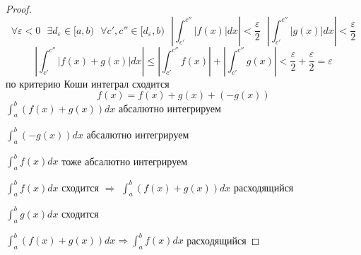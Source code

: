 \begin{proof}
  $$
  \forall \varepsilon < 0 ~~~ \exists d_{\varepsilon} \in [a,b) ~~~
  \forall c', c'' \in [d_{\varepsilon}, b) ~~~
  \left| \int_{c'}^{c''} |f(x)|dx \right| < \frac{\varepsilon}{2} ~~~
  \left| \int_{c'}^{c''} |g(x)|dx \right| < \frac{\varepsilon}{2}
  $$
  $$
  \left| \int_{c'}^{c''} |f(x) + g(x)| dx \right| \le
  \left| \int_{c'}^{c''} f(x) \right| + \left| \int_{c'}^{c''} g(x) \right|
  < \frac{\varepsilon}{2} + \frac{\varepsilon}{2} = \varepsilon
  $$
  по критерию Коши интеграл сходится
  $$
  f(x) = f(x) + g(x) + (-g(x))
  $$
  $\int_a^b (f(x) + g(x)) dx$ абсалютно интегрируем

  $\int_a^b (-g(x)) dx$ абсалютно интегрируем

  $\int_a^b f(x) dx$ тоже абсалютно интегрируем

  $\int_a^b f(x)dx$ сходится $\Rightarrow$ $\int_a^b (f(x) + g(x)) dx$
  расходящийся

  $\int_a^b g(x) dx$ сходится

  $\int_a^b (f(x) + g(x)) dx \Rightarrow \int_a^b f(x) dx$ расходящийся
\end{proof}